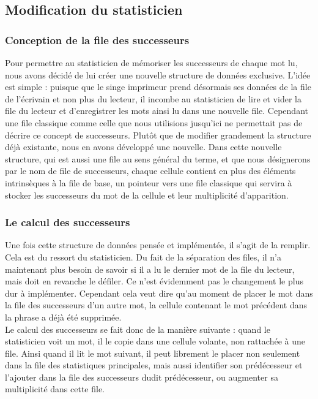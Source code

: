 \documentclass{article}
\begin{document}
\subsection{Modification du statisticien}
\subsubsection{Conception de la file des successeurs}
Pour permettre au statisticien de mémoriser les successeurs de chaque mot lu, nous avons décidé de lui créer une nouvelle structure de données exclusive. L'idée est simple : puisque que le singe imprimeur prend désormais ses données de la file de l'écrivain et non plus du lecteur, il incombe au statisticien de lire et vider la file du lecteur et d'enregistrer les mots ainsi lu dans une nouvelle file. Cependant une file classique comme celle que nous utilisions jusqu'ici ne permettait pas de décrire ce concept de successeurs. Plutôt que de modifier grandement la structure déjà existante, nous en avons développé une nouvelle.
Dans cette nouvelle structure, qui est aussi une file au sens général du terme, et que nous désignerons par le nom de file de successeurs, chaque cellule contient en plus des éléments intrinsèques à la file de base, un pointeur vers une file classique qui servira à stocker les successeurs du mot de la cellule et leur multiplicité d'apparition.
\subsubsection{Le calcul des successeurs}
Une fois cette structure de données pensée et implémentée, il s'agit de la remplir. Cela est du ressort du statisticien. Du fait de la séparation des files, il n'a maintenant plus besoin de savoir si il a lu le dernier mot de la file du lecteur, mais doit en revanche le défiler. Ce n'est évidemment pas le changement le plus dur à implémenter. Cependant cela veut dire qu'au moment de placer le mot dans la file des successeurs d'un autre mot, la cellule contenant le mot précédent dans la phrase a déjà été supprimée.\\
Le calcul des successeurs se fait donc de la manière suivante : quand le statisticien voit un mot, il le copie dans une cellule volante, non rattachée à une file. Ainsi quand il lit le mot suivant, il peut librement le placer non seulement dans la file des statistiques principales, mais aussi identifier son prédécesseur et l'ajouter dans la file des successeurs dudit prédécesseur, ou augmenter sa multiplicité dans cette file.\\
\end{document}
